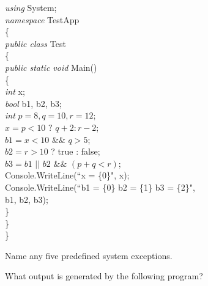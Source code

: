 {\begin{list}{E \thechapter.\theenumi}
\emph{using} System;\\
\emph{namespace} TestApp\\
\{\\
\hspace*{0.2in} \emph{public class} Test\\
\hspace*{0.2in}   \{\\
\hspace*{0.4in}        \emph{public static void} Main()\\
\hspace*{0.4in}        \{\\
\hspace*{0.6in}            \emph{int} x;\\
\hspace*{0.6in}            \emph{bool} b1, b2, b3;\\
\hspace*{0.6in}            \emph{int} $p = 8, q = 10, r = 12$;\\
\hspace*{0.6in}            $x = p < 10 \,\,? \,\, q + 2 : r - 2$;\\
\hspace*{0.6in}            $b1 = x < 10 \,\,\&\!\&\,\, q > 5$;\\
\hspace*{0.6in}            $b2 = r > 10$ ? true : false;\\
\hspace*{0.6in}            $b3 = b1 \,\,\vert\vert\,\, b2 \,\,\&\!\&\,\, (p + q < r)$;\\
\hspace*{0.6in}            Console.WriteLine(``x = \{0\}", x);\\
\hspace*{0.6in}            Console.WriteLine(``b1 = \{0\}  b2 = \{1\}  b3 = \{2\}", \\
\hspace*{0.8in}                 b1, b2, b3);\\
\hspace*{0.4in}        \}\\
\hspace*{0.2in}    \}\\
\}


\item Name any five predefined system exceptions.

\item What output is generated by the following program?


\end{list}}
